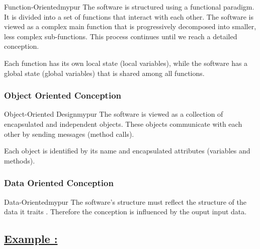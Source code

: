 \vspace{0.25cm}
\begin{prettyBox}{Function-Oriented}{mypur}
    The software is structured using a functional paradigm. It is divided into a set of functions 
that interact with each other. The software is viewed as a complex main function that is 
progressively decomposed into smaller, less complex sub-functions. This process continues until
we reach a detailed conception.

    \vspace{0.15cm}
    Each function has its own local state (local variables), while the software has
a global state (global variables) that is shared among all functions.
\end{prettyBox}

\vspace{0.5cm}
\subsubsection{Object Oriented Conception}

\vspace{0.25cm}

\begin{prettyBox}{Object-Oriented Design}{mypur}
    The software is viewed as a collection of encapsulated and independent objects. 
These objects communicate with each other by sending messages (method calls).

    \vspace{0.15cm}
    Each object is identified by its name and encapsulated attributes (variables and methods).
\end{prettyBox}


\vspace{0.5cm}

\subsubsection{Data Oriented Conception}

\vspace{0.25cm}

\begin{prettyBox}{Data-Oriented}{mypur}
    The software's structure must reflect the structure of the data it traits .
    Therefore the conception is influenced by the ouput input data.
\end{prettyBox}


\subsection*{\underline{Example :}}
